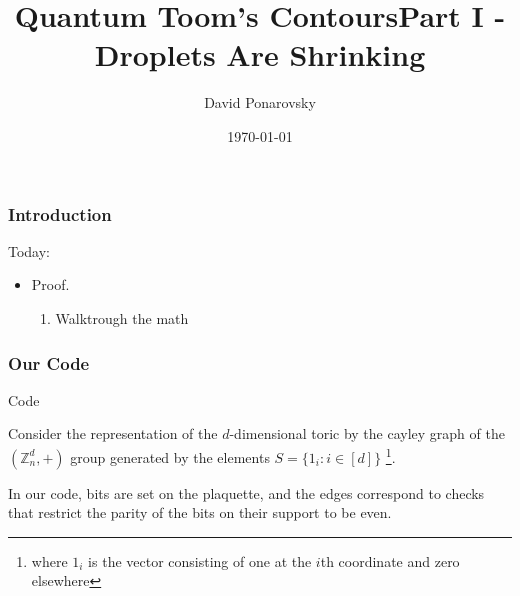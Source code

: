 \documentclass{beamer}
\begin{document}
 



\begin{frame}
  \title{Quantum Toom's Contours}
    \author{David Ponarovsky}
    \date{\today}
    \titlepage
\end{frame}


\begin{frame}

\frametitle{Introduction}
\begin{block}{Today:}
\begin{itemize}
  \item Proof. 
    \begin{enumerate}
      \item Walktrough the math 
    \end{enumerate}
\end{itemize}
\end{block}
\end{frame}

  
\begin{frame}

  \title{Part I - Droplets Are Shrinking}
    \titlepage


\end{frame}
\begin{frame}
  \frametitle{Our Code}

  \begin{block}{Code}

    Consider the representation of the $d$-dimensional toric by the cayley graph of the $\left( \mathbb{Z}_{n}^{d}, + \right)$ group generated by the elements $S = \{ 1_{i} : i \in [d] \}$ \footnote{where $1_{i}$ is the vector consisting of one at the $i$th coordinate and zero elsewhere}.

    In our code, bits are set on the plaquette, and the edges correspond to checks that restrict the parity of the bits on their support to be even.



  \end{block}


\end{frame}
\end{document}
